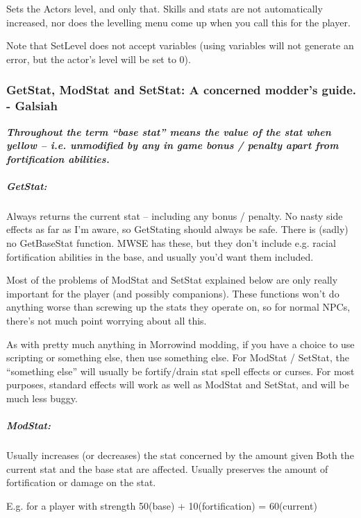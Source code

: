\documentclass[
]{article}
\begin{document}
Sets the Actors level, and only that. Skills and stats are not
automatically increased, nor does the levelling menu come up when you
call this for the player.

Note that SetLevel does not accept variables (using variables will not
generate an error, but the actor's level will be set to 0).

\hypertarget{getstat-modstat-and-setstat-a-concerned-modders-guide.---galsiah}{%
\subsubsection{GetStat, ModStat and SetStat: A concerned modder's guide.
-
Galsiah}\label{getstat-modstat-and-setstat-a-concerned-modders-guide.---galsiah}}

\emph{\textbf{Throughout the term ``base stat'' means the value of the
stat when yellow -- i.e. unmodified by any in game bonus / penalty apart
from fortification abilities.}}

\hypertarget{getstat}{%
\subparagraph{GetStat:}\label{getstat}}

Always returns the current stat -- including any bonus / penalty. No
nasty side effects as far as I'm aware, so GetStating should always be
safe. There is (sadly) no GetBaseStat function. MWSE has these, but they
don't include e.g. racial fortification abilities in the base, and
usually you'd want them included.

Most of the problems of ModStat and SetStat explained below are only
really important for the player (and possibly companions). These
functions won't do anything worse than screwing up the stats they
operate on, so for normal NPCs, there's not much point worrying about
all this.

As with pretty much anything in Morrowind modding, if you have a choice
to use scripting or something else, then use something else. For ModStat
/ SetStat, the ``something else'' will usually be fortify/drain stat
spell effects or curses. For most purposes, standard effects will work
as well as ModStat and SetStat, and will be much less buggy.

\hypertarget{modstat}{%
\subparagraph{ModStat:}\label{modstat}}

Usually increases (or decreases) the stat concerned by the amount given
Both the current stat and the base stat are affected. Usually preserves
the amount of fortification or damage on the stat.

E.g. for a player with strength 50(base) + 10(fortification) =
60(current)
\end{document}
